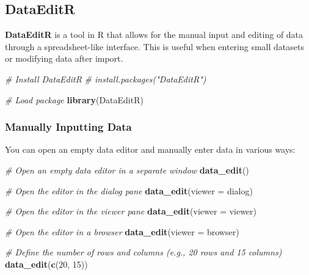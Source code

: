 \documentclass[
]{book}
\newenvironment{Shaded}{\begin{snugshade}}{\end{snugshade}}
\newcommand{\AttributeTok}[1]{\textcolor[rgb]{0.13,0.29,0.53}{#1}}
\newcommand{\CommentTok}[1]{\textcolor[rgb]{0.56,0.35,0.01}{\textit{#1}}}
\newcommand{\DecValTok}[1]{\textcolor[rgb]{0.00,0.00,0.81}{#1}}
\newcommand{\FunctionTok}[1]{\textcolor[rgb]{0.13,0.29,0.53}{\textbf{#1}}}
\newcommand{\NormalTok}[1]{#1}
\newcommand{\StringTok}[1]{\textcolor[rgb]{0.31,0.60,0.02}{#1}}
\begin{document}
\subsection*{DataEditR}\label{dataeditr}

\textbf{DataEditR} is a tool in R that allows for the manual input and editing of data through a spreadsheet-like interface. This is useful when entering small datasets or modifying data after import.

\begin{Shaded}
\begin{Highlighting}[]
\CommentTok{\# Install DataEditR}
\CommentTok{\# install.packages("DataEditR")}

\CommentTok{\# Load package}
\FunctionTok{library}\NormalTok{(DataEditR)}
\end{Highlighting}
\end{Shaded}

\subsubsection*{Manually Inputting Data}\label{manually-inputting-data-1}

You can open an empty data editor and manually enter data in various ways:

\begin{Shaded}
\begin{Highlighting}[]
\CommentTok{\# Open an empty data editor in a separate window}
\FunctionTok{data\_edit}\NormalTok{()}

\CommentTok{\# Open the editor in the dialog pane}
\FunctionTok{data\_edit}\NormalTok{(}\AttributeTok{viewer =} \StringTok{\textquotesingle{}dialog\textquotesingle{}}\NormalTok{)}

\CommentTok{\# Open the editor in the viewer pane}
\FunctionTok{data\_edit}\NormalTok{(}\AttributeTok{viewer =} \StringTok{\textquotesingle{}viewer\textquotesingle{}}\NormalTok{)}

\CommentTok{\# Open the editor in a browser}
\FunctionTok{data\_edit}\NormalTok{(}\AttributeTok{viewer =} \StringTok{\textquotesingle{}browser\textquotesingle{}}\NormalTok{)}

\CommentTok{\# Define the number of rows and columns (e.g., 20 rows and 15 columns)}
\FunctionTok{data\_edit}\NormalTok{(}\FunctionTok{c}\NormalTok{(}\DecValTok{20}\NormalTok{, }\DecValTok{15}\NormalTok{))}
\end{Highlighting}
\end{Shaded}
\end{document}
